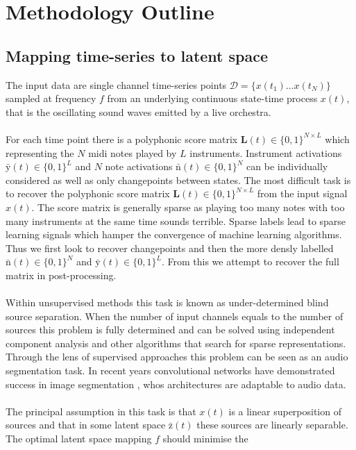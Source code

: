 \documentclass{article}[12pt]
\numberwithin{equation}{section}
\begin{document}
\section{Methodology Outline}
\subsection{Mapping time-series to latent space}
The input data are single channel time-series points $\mathcal{D}=\{x(t_1)\dots
x(t_N)\}$ sampled at frequency $f$ from an underlying continuous state-time
process $x(t)$, that is the oscillating sound waves emitted by a live orchestra.
\\\\
For each time point there is a polyphonic score matrix $\mathbf{L}(t)\in\{0,1\}^{N\times L}$ which
representing the $N$ midi notes played by $L$ instruments. Instrument activations
$\bar{\mathrm{y}}(t)\in\{0,1\}^L$ and $N$ note activations
$\bar{\mathrm{n}}(t)\in\{0,1\}^N$ can be individually considered as well as only
changepoints between states.
\noindent
The most difficult task is to recover the polyphonic score matrix
$\mathbf{L}(t)\in\{0,1\}^{N\times L}$ from the input signal $x(t)$. The score matrix
is generally sparse as playing too many notes with too many instruments at the
same time sounds terrible. Sparse labels lead to sparse learning signals which
hamper the convergence of machine learning algorithms. Thus we first look to
recover changepoints and then the more densly labelled $\bar{\mathrm{n}}(t)\in\{0,1\}^N$
and $\bar{\mathrm{y}}(t)\in\{0,1\}^L$.
From this we attempt to recover the full matrix in post-processing.
\\\\
Within unsupervised methods this task is known as
under-determined blind source separation. When the number of input channels
equals to the number of sources this problem is fully determined and can be
solved using independent component analysis
\cite{Platt1995Information-MaximizationDeconvolution} and other algorithms
that search for sparse representations. Through the lens of supervised approaches
this problem can be seen as an audio segmentation task. In recent years
convolutional networks have demonstrated success in image segmentation \cite{},
whos architectures are adaptable to audio data.
\\\\
The principal assumption in this task is that $x(t)$ is a linear superposition
of sources and that in some latent space $\bar{\mathrm{z}}(t)$ these sources are
linearly separable. The optimal latent space mapping $f$ should minimise the
\end{document}
